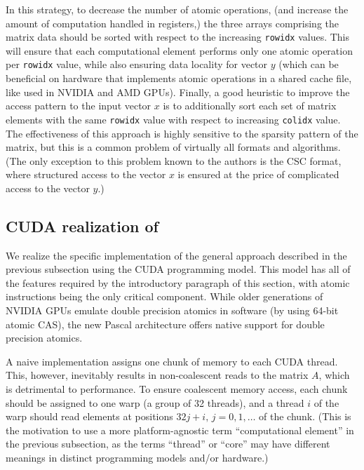 In this strategy, to decrease the number of atomic operations, (and increase the amount of
computation handled in registers,) the three arrays comprising the matrix data
should be sorted with respect to the increasing \texttt{rowidx} values.
This will ensure that each computational element performs only one atomic
operation per \texttt{rowidx} value, while also ensuring data locality
for vector $y$ (which can be beneficial on hardware that implements
atomic operations in a shared cache file, like used in NVIDIA and AMD
GPUs).
Finally, a good heuristic to improve the access pattern to the input vector $x$
is to additionally sort each set of matrix elements with the same
\texttt{rowidx} value with respect to increasing \texttt{colidx} value.
The effectiveness of this approach is highly sensitive to the sparsity pattern of
the matrix, but this is a common problem of virtually all \spmv
formats and algorithms.
(The only exception to this problem known to the authors is the CSC format, 
where structured access to
the vector $x$ is ensured at the price of complicated access to the vector $y$.)

\subsection{CUDA realization of \coo \spmv}
\label{ss:cuda-coo-spmv}

We realize the specific implementation of the general approach described in 
the previous subsection using the CUDA programming model.
This model has all of the features required by the introductory paragraph of
this section, with atomic instructions being the only critical component.
While older generations of NVIDIA GPUs emulate double precision atomics in
software (by using 64-bit atomic CAS), the new Pascal architecture offers
native support for double precision atomics.

A naive implementation assigns one chunk of memory to
each CUDA thread. This, however, inevitably results in non-coalescent reads to the 
matrix $A$, which is detrimental to performance.
To ensure coalescent memory access, each chunk should be assigned to one warp
(a group of 32 threads), and a thread $i$ of the warp should read elements at
positions $32j + i,\, j = 0,1,\ldots$ of the chunk.
(This is the motivation to use a more platform-agnostic term ``computational
element'' in the previous subsection, as the terms ``thread'' or ``core'' may
have different meanings in distinct programming models and/or hardware.)

